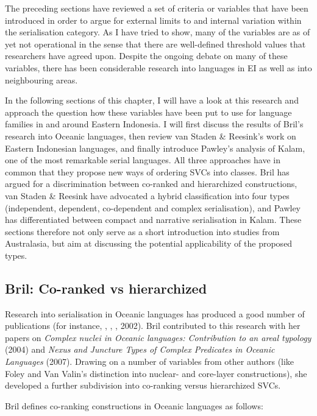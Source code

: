 The preceding sections have reviewed a set of criteria or variables that have been introduced in order to argue for external limits to and internal variation within the serialisation category. As I have tried to show, many of the variables are as of yet not operational in the sense that there are well-defined threshold values that researchers have agreed upon. Despite the ongoing debate on many of these variables, there has been considerable research into languages in EI as well as into neighbouring areas. 

In the following sections of this chapter, I will have a look at this research and approach the question how these variables have been put to use for language families in and around Eastern Indonesia. I will first discuss the results of Bril's research into Oceanic languages, then review van Staden \& Reesink's work on Eastern Indonesian languages, and finally introduce Pawley's analysis of Kalam, one of the most remarkable serial languages. All three approaches have in common that they propose new ways of ordering SVCs into classes. Bril has argued for a discrimination between co-ranked and hierarchized constructions, van Staden \& Reesink have advocated a hybrid classification into four types (independent, dependent, co-dependent and complex serialisation), and Pawley has differentiated between compact and narrative serialisation in Kalam. These sections therefore not only serve as a short introduction into studies from Australasia, but aim at discussing the potential applicability of the proposed types.

\subsection{Bril: Co-ranked vs hierarchized}

Research into serialisation in Oceanic languages has produced a good number of publications (for instance, \cite{durie1988verb}, \cite{bradshaw1993subject}, \cite{crowley1987serial}, 2002). Bril contributed to this research with her papers on \textit{Complex nuclei in Oceanic languages: Contribution to an areal typology} (2004) and \textit{Nexus and Juncture Types of Complex Predicates in Oceanic Languages} (2007). Drawing on a number of variables from other authors (like Foley and Van Valin's distinction into nuclear- and core-layer constructions), she developed a further subdivision into co-ranking versus hierarchized SVCs. 

Bril defines co-ranking constructions in Oceanic languages as follows:

